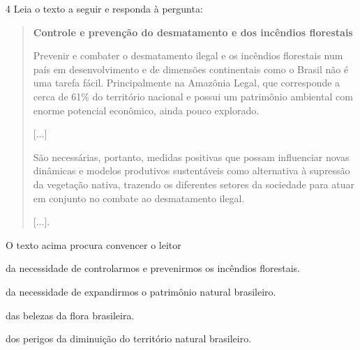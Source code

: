 
\num{4} Leia o texto a seguir e responda à pergunta:

\begin{quote}
\textbf{Controle e prevenção do desmatamento e dos incêndios florestais}

Prevenir e combater o desmatamento ilegal e os incêndios florestais num
país em desenvolvimento e de dimensões continentais como o Brasil não é
uma tarefa fácil. Principalmente na Amazônia Legal, que corresponde a
cerca de 61\% do território nacional e possui um patrimônio ambiental
com enorme potencial econômico, ainda pouco explorado.

{[}...{]}

São necessárias, portanto, medidas positivas que possam influenciar
novas dinâmicas e modelos produtivos sustentáveis como alternativa à
supressão da vegetação nativa, trazendo os diferentes setores da
sociedade para atuar em conjunto no combate ao desmatamento ilegal.

{[}...{]}.

\end{quote}

O texto acima procura convencer o leitor

\begin{escolha}
\item da necessidade de controlarmos e prevenirmos os incêndios florestais.

\item da necessidade de expandirmos o patrimônio natural brasileiro.

\item das belezas da flora brasileira.

\item dos perigos da diminuição do território natural brasileiro.
\end{escolha}

